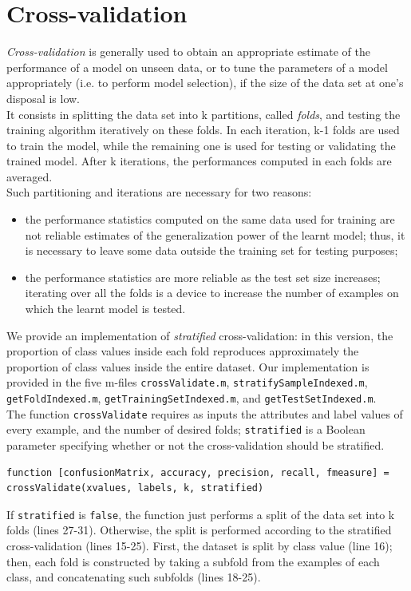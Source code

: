 \documentclass{article}
\begin{document}
\section{Cross-validation}
\emph{Cross-validation} is generally used to obtain an appropriate estimate of the performance of a model on unseen data, or to tune the parameters of a model appropriately (i.e. to perform model selection), if the size of the data set at one's disposal is low.\\
It consists in splitting the data set into k partitions, called \emph{folds}, and testing the training algorithm iteratively on these folds. In each iteration, k-1 folds are used to train the model, while the remaining one is used for testing or validating the trained model. After k iterations, the performances computed in each folds are averaged.\\
Such partitioning and iterations are necessary for two reasons:
\begin{itemize}
	\item the performance statistics computed on the same data used for training are not reliable estimates of the generalization power of the learnt model; thus, it is necessary to leave some data outside the training set for testing purposes;
	\item the performance statistics are more reliable as the test set size increases; iterating over all the folds is a device to increase the number of examples on which the learnt model is tested.
\end{itemize}
We provide an implementation of \emph{stratified} cross-validation: in this version, the proportion of class values inside each fold reproduces approximately the proportion of class values inside the entire dataset. Our implementation is provided in the five m-files \verb$crossValidate.m$, \verb$stratifySampleIndexed.m$, \verb$getFoldIndexed.m$, \verb$getTrainingSetIndexed.m$, and \verb$getTestSetIndexed.m$.\\
The function \verb$crossValidate$ requires as inputs the attributes and label values of every example, and the number of desired folds; \verb$stratified$ is a Boolean parameter specifying whether or not the cross-validation should be stratified.
\begin{lstlisting}[breaklines=true]
function [confusionMatrix, accuracy, precision, recall, fmeasure] = crossValidate(xvalues, labels, k, stratified)
\end{lstlisting}
If \verb$stratified$ is \verb$false$, the function just performs a split of the data set into k folds (lines 27-31). Otherwise, the split is performed according to the stratified cross-validation (lines 15-25). First, the dataset is split by class value (line 16); then, each fold is constructed by taking a subfold from the examples of each class, and concatenating such subfolds (lines 18-25).
\end{document}
